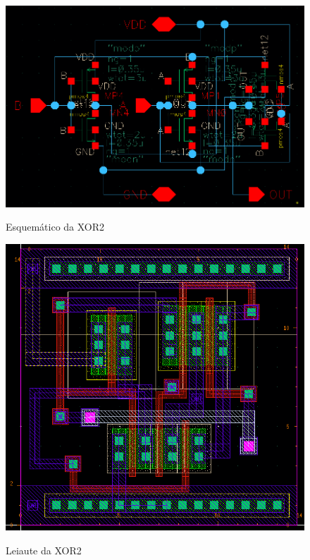 \documentclass{iiufrgs}
\begin{document}
\begin{figure}[htbp]
    \centering
    \caption{Esquemático da XOR2}
    \includegraphics[scale=0.5]{images/schem.png}
    \label{fig:esquematico}
\end{figure}

\begin{figure}[htbp]
    \centering
    \caption{Leiaute da XOR2}
    \includegraphics[scale=0.65]{images/lay.png}
    \label{fig:leiaute}
\end{figure}
\end{document}
